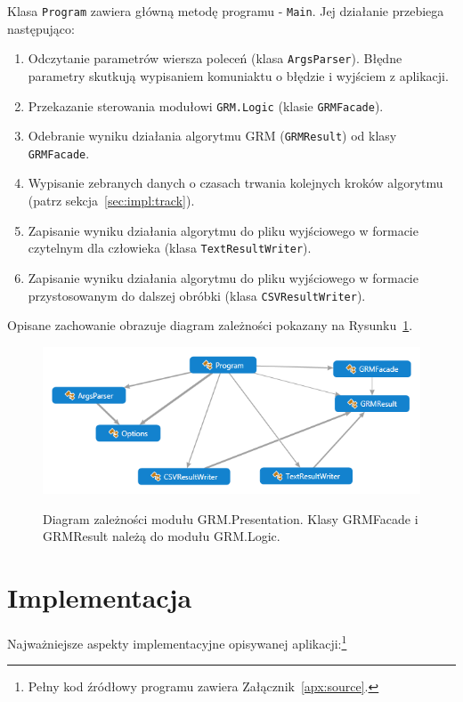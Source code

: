 \documentclass[a4paper,10pt]{article}
\begin{document}
 Klasa \verb+Program+ zawiera główną metodę programu - \verb+Main+. 
 Jej działanie przebiega następująco:
 
 \begin{enumerate}
  \item Odczytanie parametrów wiersza poleceń (klasa \verb+ArgsParser+).
  Błędne parametry skutkują wypisaniem komuniaktu o błędzie i wyjściem z aplikacji.
  \item Przekazanie sterowania modułowi \verb+GRM.Logic+ (klasie \verb+GRMFacade+).
  \item Odebranie wyniku działania algorytmu GRM (\verb+GRMResult+) od klasy \verb+GRMFacade+.
  \item Wypisanie zebranych danych o czasach trwania kolejnych kroków algorytmu (patrz sekcja~\ref{sec:impl:track}).
  \item Zapisanie wyniku działania algorytmu do pliku wyjściowego w formacie czytelnym dla człowieka (klasa \verb+TextResultWriter+).
  \item Zapisanie wyniku działania algorytmu do pliku wyjściowego w formacie przystosowanym do dalszej obróbki (klasa \verb+CSVResultWriter+).
 \end{enumerate}
 
 Opisane zachowanie obrazuje diagram zależności pokazany na Rysunku~\ref{fig:diag:pres:dep}.
 
 \begin{figure}[!ht]
  \begin{center}
   \scalebox{0.7}
   {
    \includegraphics{../diagrams/Presentation_dependency_diagram.png}
   }
  \end{center}
  \caption{
   Diagram zależności modułu GRM.Presentation.
   Klasy GRMFacade i GRMResult należą do modułu GRM.Logic.
  }
  \label{fig:diag:pres:dep}
 \end{figure}


\section{Implementacja} \label{sec:impl}
Najważniejsze aspekty implementacyjne opisywanej aplikacji:\footnote{Pełny kod źródłowy programu zawiera Załącznik~\ref{apx:source}.}
\end{document}
